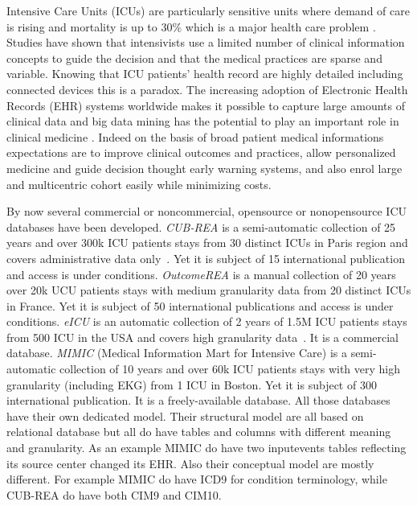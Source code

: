 %
%

Intensive Care Units (ICUs) are particularly sensitive units  where demand of
care is rising\cite{angus2000} and mortality is up to 30\% which is a major
health care problem \cite{icu-mortality}. Studies have shown that intensivists
use a limited number of clinical information concepts to guide the
decision\cite{icu-evidence} and that the medical practices are sparse and
variable. Knowing that ICU patients' health record are highly detailed
including connected devices this is a paradox.
The increasing adoption of Electronic Health Records (EHR) systems worldwide
makes it possible to capture large amounts of clinical data
\cite{bigdata-promise} and big data mining has the potential to play an
important role in clinical medicine \cite{bigdata-mining}. Indeed on the basis
of broad patient medical informations expectations are to improve clinical
outcomes and practices, allow personalized medicine and guide decision thought
early warning systems, and also enrol large and multicentric cohort easily
while minimizing costs.

By now several commercial or noncommercial, opensource or nonopensource ICU
databases have been developed.
\emph{CUB-REA} is a semi-automatic collection of 25 years and over 300k ICU
patients stays from 30 distinct ICUs in Paris region and covers administrative
data only \cite{cubrea-descr,cubrea-website}. Yet it is subject of 15
international publication and access is under conditions.
\emph{OutcomeREA} is a manual collection of 20 years over 20k UCU patients
stays with medium granularity data from 20 distinct ICUs in France. Yet it is
subject of 50 international publications and access is under conditions.
\emph{eICU} \cite{eicu-website} is an automatic collection of 2 years of 1.5M
ICU patients stays from 500 ICU in the USA and covers high granularity
data \cite{mimic-i2b2}. It is a commercial database.
\emph{MIMIC} (Medical Information Mart for Intensive Care) is a
semi-automatic collection of 10 years and over 60k ICU patients stays with very
high granularity (including EKG) from 1 ICU in Boston. Yet it is subject of 300
international publication. It is a freely-available database.
All those databases have their own dedicated model. Their structural model
are all based on relational database but all do have tables and columns with
different meaning and granularity. As an example MIMIC do have two inputevents
tables reflecting its source center changed its EHR. Also their conceptual
model are mostly different. For example MIMIC do have ICD9 for condition
terminology, while CUB-REA do have both CIM9 and CIM10. 

